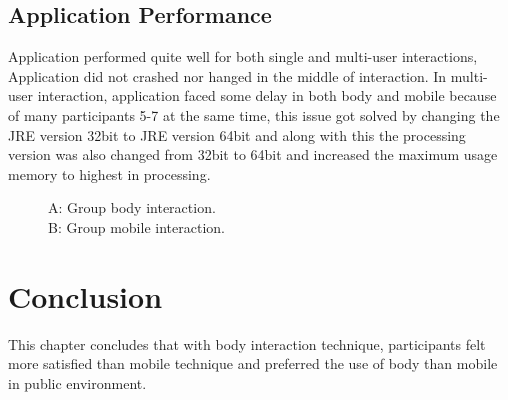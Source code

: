 \subsection{Application Performance}
Application performed quite well for both single and multi-user interactions, Application did not crashed nor hanged in the middle of interaction. In multi-user interaction, application faced some delay in both body and mobile because of many participants 5-7 at the same time, this issue got solved by changing the 
JRE version 32bit to JRE version 64bit and along with this the processing version was also changed from 32bit to 64bit and increased the maximum usage memory to highest in processing.

\begin{figure}[H]
    \centering
    \caption{A: Group body interaction. \\ B: Group mobile interaction.}%
    \label{fig:Focus_group_room}%
\end{figure}

\section{Conclusion}
This chapter concludes that with body interaction technique, participants felt more satisfied than mobile technique and preferred the use of body than mobile in public environment.

